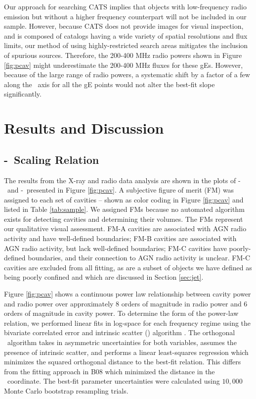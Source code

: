 \documentclass{emulateapj}
\begin{document}
Our approach for searching CATS implies that objects with
low-frequency radio emission but without a higher frequency
counterpart will not be included in our sample. However, because CATS
does not provide images for visual inspection, and is composed of
catalogs having a wide variety of spatial resolutions and flux limits,
our method of using highly-restricted search areas mitigates the
inclusion of spurious sources. Therefore, the 200-400 MHz radio powers
shown in Figure \ref{fig:pcav} might underestimate the 200-400 MHz
fluxes for these gEs. However, because of the large range of radio
powers, a systematic shift by a factor of a few along the \prad\ axis
for all the gE points would not alter the best-fit slope
significantly.

\section{Results and Discussion}
\label{sec:r&d}

\subsection{\pjet-\prad\ Scaling Relation}
\label{sec:relation}

The results from the X-ray and radio data analysis are shown in the
plots of \pcav-\phigh\ and \pcav-\plow\ presented in Figure
\ref{fig:pcav}. A subjective figure of merit (FM) was assigned to each
set of cavities -- shown as color coding in Figure \ref{fig:pcav} and
listed in Table \ref{tab:sample}. We assigned FMs because no automated
algorithm exists for detecting cavities and determining their
volumes. The FMs represent our qualitative visual assessment. FM-A
cavities are associated with AGN radio activity and have well-defined
boundaries; FM-B cavities are associated with AGN radio activity, but
lack well-defined boundaries; FM-C cavities have poorly-defined
boundaries, and their connection to AGN radio activity is
unclear. FM-C cavities are excluded from all fitting, as are a subset
of objects we have defined as being poorly confined and which are
discussed in Section \ref{sec:jet}.

Figure \ref{fig:pcav} shows a continuous power law relationship
between cavity power and radio power over approximately 8 orders of
magnitude in radio power and 6 orders of magnitude in cavity power. To
determine the form of the power-law relation, we performed linear fits
in log-space for each frequency regime using the bivariate correlated
error and intrinsic scatter (\bces) algorithm \citep{bces}. The
orthogonal \bces\ algorithm takes in asymmetric uncertainties for both
variables, assumes the presence of intrinsic scatter, and performs a
linear least-squares regression which minimizes the squared orthogonal
distance to the best-fit relation. This differs from the fitting
approach in B08 which minimized the distance in the
\pcav\ coordinate. The best-fit parameter uncertainties were
calculated using $10,000$ Monte Carlo bootstrap resampling trials.
\end{document}
